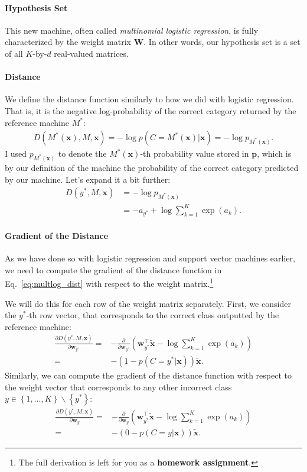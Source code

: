 \documentclass{report}
\newcommand{\vect}[1]{\mathbf{#1}}
\newcommand{\matr}[1]{\mathbf{#1}}
\newcommand{\vx}[0]{\vect{x}}
\newcommand{\vp}[0]{\vect{p}}
\newcommand{\vw}[0]{\vect{w}}
\newcommand{\mW}[0]{\matr{W}}
\begin{document}
\paragraph{Hypothesis Set} 

This new machine, often called {\it multinomial logistic regression}, is fully
characterized by the weight matrix $\mW$. In other words, our hypothesis set is
a set of all $K$-by-$d$ real-valued matrices. 

\paragraph{Distance} 
We define the distance function similarly to how we did with logistic
regression. That is, it is the negative log-probability of the correct category
returned by the reference machine $M^*$:
\begin{align}
    \label{eq:multlog_dist}
    D(M^*(\vx), M, \vx) = -\log p(C=M^*(\vx) | \vx) = -\log p_{M^*(\vx)}.
\end{align}
I used $p_{M^*(\vx)}$ to denote the $M^*(\vx)$-th probability value stored in
$\vp$, which is by our definition of the machine the probability of the correct
category predicted by our machine.  Let's expand it a bit further:
\begin{align*}
    D(y^*, M, \vx) &= -\log p_{M^*(\vx)} \\
                   &= -a_{y^*} + \log \sum_{k=1}^K \exp(a_k).
\end{align*}

\paragraph{Gradient of the Distance}

As we have done so with logistic regression and support vector machines earlier,
we need to compute the gradient of the distance function in
Eq.~\eqref{eq:multlog_dist} with respect to the weight matrix.\footnote{
    The full derivation is left for you as a {\bf homework assignment}.
}

We will do this
for each row of the weight matrix separately. First, we consider the $y^*$-th
row vector, that corresponds to the correct class outputted by the reference
machine: 
\begin{align*}
    \frac{\partial D(y^*, M, \vx)}{\partial \vw_{y^*}} =&
    -\frac{\partial}{\partial \vw_{y^*}} \left(
        \vw_{y^*}^\top \tilde{\vx} - \log \sum_{k=1}^K \exp(a_k)
    \right) \\
    =& -( 1 - p(C=y^* | \vx)) \tilde{\vx}.
\end{align*}
Similarly, we can compute the gradient of the distance function with respect to
the weight vector that corresponds to any other incorrect class $y \in \left\{1,
\ldots, K \right\} \backslash \left\{ y^* \right\}$:
\begin{align*}
    \frac{\partial D(y^*, M, \vx)}{\partial \vw_{y}} =&
    -\frac{\partial}{\partial \vw_{y}} \left(
        \vw_{y^*}^\top \tilde{\vx} - \log \sum_{k=1}^K \exp(a_k)
    \right) \\
    =& -( 0 - p(C=y | \vx)) \tilde{\vx}.
\end{align*}
\end{document}

